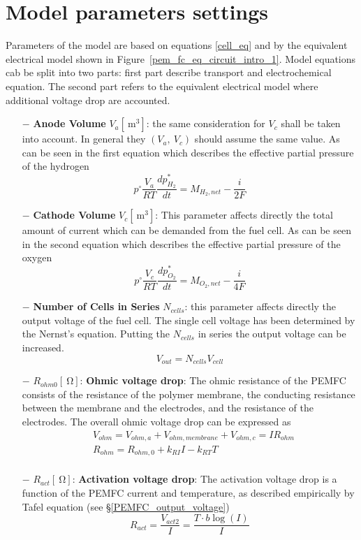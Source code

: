 \documentclass[11pt,a4paper]{article}
\numberwithin{equation}{section}
\theoremstyle{it}
\theoremstyle{definition}
\begin{document}
\section{Model parameters settings}
Parameters of the model are based on equations \eqref{cell_eq} and by the equivalent electrical model shown in Figure~\ref{pem_fc_eq_circuit_intro_1}. Model equations cab be split into two parts: first part describe transport and electrochemical equation. The second part refers to the equivalent electrical model where additional voltage drop are accounted. 
\begin{itemize}
	\item[$-$] \textbf{Anode Volume} $V_a[\SI{}{\cubic\meter}]$: the same consideration for $V_c$ shall be taken into account. In general they $(V_a,\ V_c)$ should assume the same value. As can be seen in the first equation which describes the effective partial pressure of the hydrogen
	\begin{equation*}
		p^\circ\frac{V_a}{RT}\frac{dp_{H_2}^*}{dt} = M_{H_2,net} - 	\frac{i}{2F}
	\end{equation*}
	\item[$-$] \textbf{Cathode Volume} $V_c[\SI{}{\cubic\meter}]$: This parameter affects directly the total amount of current which can be demanded from the fuel cell. As can be seen in the second equation which describes the effective partial pressure of the oxygen 
	\begin{equation*}
		p^\circ\frac{V_c}{RT}\frac{dp_{O_2}^*}{dt} = M_{O_2,net} - 	\frac{i}{4F}
	\end{equation*}
	\item[$-$] \textbf{Number of Cells in Series} $N_{cells}$: this parameter affects directly the output voltage of the fuel cell. The single cell voltage has been determined by the Nernst's equation. Putting the $N_{cells}$ in series the output voltage can be increased.
	\begin{equation*}
		V_{out} = N_{cells}V_{cell}
	\end{equation*}
	\item[$-$] $R_{ohm0}[\SI{}{\ohm}]$: \textbf{Ohmic voltage drop}: The ohmic resistance of the PEMFC consists of the resistance of the polymer membrane, the conducting resistance between the membrane and the electrodes, and the resistance of the electrodes. The overall ohmic voltage drop can be expressed as \begin{equation*}
		\begin{aligned}
			&	V_{ohm} = V_{ohm,a} + V_{ohm,membrane} + V_{ohm,c} = IR_{ohm} \\[8pt]
			&	R_{ohm} = R_{ohm,0} + k_{RI}I - k_{RT}T \\[8pt]
		\end{aligned} 
	\end{equation*}
	\item[$-$] $R_{act}[\SI{}{\ohm}]$: \textbf{Activation voltage drop}: The activation voltage drop is a function of the PEMFC current and temperature, as described empirically by Tafel equation (see §\ref{PEMFC_output_voltage})
	\begin{equation*}
		R_{act}=\frac{V_{act2}}{I} = \frac{T\cdot b\log(I)}{I}
	\end{equation*}
	

\end{itemize}
\end{document}
